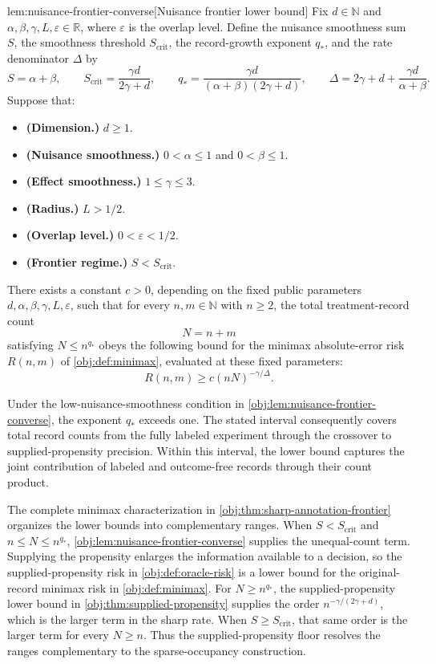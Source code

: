 \begin{lemmav}{lem:nuisance-frontier-converse}[Nuisance frontier lower bound]
Fix \(d\in\mathbb N\) and \(\alpha,\beta,\gamma,L,\varepsilon\in\mathbb R\), where \(\varepsilon\) is the overlap level. Define the nuisance smoothness sum \(S\), the smoothness threshold \(S_{\mathrm{crit}}\), the record-growth exponent \(q_*\), and the rate denominator \(\Delta\) by
\[
S=\alpha+\beta,\qquad
S_{\mathrm{crit}}=\frac{\gamma d}{2\gamma+d},\qquad
q_*=\frac{\gamma d}{(\alpha+\beta)(2\gamma+d)},\qquad
\Delta=2\gamma+d+\frac{\gamma d}{\alpha+\beta}.
\]
Suppose that:
\begin{itemize}
\item \textbf{(Dimension.)} \(d\ge1\).
\item \textbf{(Nuisance smoothness.)} \(0<\alpha\le1\) and \(0<\beta\le1\).
\item \textbf{(Effect smoothness.)} \(1\le\gamma\le3\).
\item \textbf{(Radius.)} \(L>1/2\).
\item \textbf{(Overlap level.)} \(0<\varepsilon<1/2\).
\item \textbf{(Frontier regime.)} \(S<S_{\mathrm{crit}}\).
\end{itemize}
There exists a constant \(c>0\), depending on the fixed public parameters \(d,\alpha,\beta,\gamma,L,\varepsilon\), such that for every \(n,m\in\mathbb N\) with \(n\ge2\), the total treatment-record count
\[
N=n+m
\]
satisfying \(N\le n^{q_*}\) obeys the following bound for the minimax absolute-error risk \(R(n,m)\) of \cref{obj:def:minimax}, evaluated at these fixed parameters:
\[
R(n,m)\ge c(nN)^{-\gamma/\Delta}.
\]
\end{lemmav}

Under the low-nuisance-smoothness condition in \cref{obj:lem:nuisance-frontier-converse}, the exponent \(q_*\) exceeds one. The stated interval consequently covers total record counts from the fully labeled experiment through the crossover to supplied-propensity precision. Within this interval, the lower bound captures the joint contribution of labeled and outcome-free records through their count product.

The complete minimax characterization in \cref{obj:thm:sharp-annotation-frontier} organizes the lower bounds into complementary ranges. When \(S<S_{\mathrm{crit}}\) and \(n\le N\le n^{q_*}\), \cref{obj:lem:nuisance-frontier-converse} supplies the unequal-count term. Supplying the propensity enlarges the information available to a decision, so the supplied-propensity risk in \cref{obj:def:oracle-risk} is a lower bound for the original-record minimax risk in \cref{obj:def:minimax}. For \(N\ge n^{q_*}\), the supplied-propensity lower bound in \cref{obj:thm:supplied-propensity} supplies the order \(n^{-\gamma/(2\gamma+d)}\), which is the larger term in the sharp rate. When \(S\ge S_{\mathrm{crit}}\), that same order is the larger term for every \(N\ge n\). Thus the supplied-propensity floor resolves the ranges complementary to the sparse-occupancy construction.

